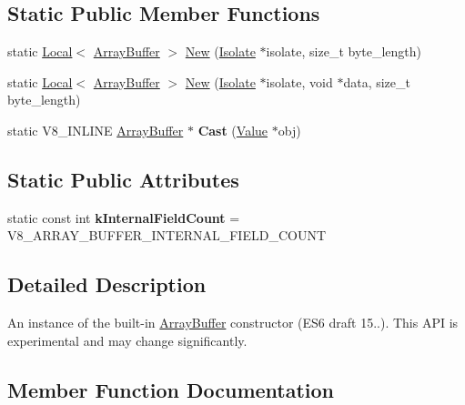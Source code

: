 \subsection*{Static Public Member Functions}
\begin{DoxyCompactItemize}
\item 
static \hyperlink{classv8_1_1Local}{Local}$<$ \hyperlink{classv8_1_1ArrayBuffer}{Array\+Buffer} $>$ \hyperlink{classv8_1_1ArrayBuffer_ad752e03d7cc7fe863656ad6183785ab7}{New} (\hyperlink{classv8_1_1Isolate}{Isolate} $\ast$isolate, size\+\_\+t byte\+\_\+length)
\item 
static \hyperlink{classv8_1_1Local}{Local}$<$ \hyperlink{classv8_1_1ArrayBuffer}{Array\+Buffer} $>$ \hyperlink{classv8_1_1ArrayBuffer_ad3e0120ae80077d607d5645c4f647932}{New} (\hyperlink{classv8_1_1Isolate}{Isolate} $\ast$isolate, void $\ast$data, size\+\_\+t byte\+\_\+length)
\item 
\hypertarget{classv8_1_1ArrayBuffer_a4b0a703ae34217507a8ebc9cabf7336a}{}static V8\+\_\+\+I\+N\+L\+I\+N\+E \hyperlink{classv8_1_1ArrayBuffer}{Array\+Buffer} $\ast$ {\bfseries Cast} (\hyperlink{classv8_1_1Value}{Value} $\ast$obj)\label{classv8_1_1ArrayBuffer_a4b0a703ae34217507a8ebc9cabf7336a}

\end{DoxyCompactItemize}
\subsection*{Static Public Attributes}
\begin{DoxyCompactItemize}
\item 
\hypertarget{classv8_1_1ArrayBuffer_af49000a2ea120e49da846ef02a42ac69}{}static const int {\bfseries k\+Internal\+Field\+Count} = V8\+\_\+\+A\+R\+R\+A\+Y\+\_\+\+B\+U\+F\+F\+E\+R\+\_\+\+I\+N\+T\+E\+R\+N\+A\+L\+\_\+\+F\+I\+E\+L\+D\+\_\+\+C\+O\+U\+N\+T\label{classv8_1_1ArrayBuffer_af49000a2ea120e49da846ef02a42ac69}

\end{DoxyCompactItemize}


\subsection{Detailed Description}
An instance of the built-\/in \hyperlink{classv8_1_1ArrayBuffer}{Array\+Buffer} constructor (E\+S6 draft 15..). This A\+P\+I is experimental and may change significantly. 

\subsection{Member Function Documentation}
\hypertarget{classv8_1_1ArrayBuffer_ab73b98ba6436b57c5a1b3d29429e0199}{}
